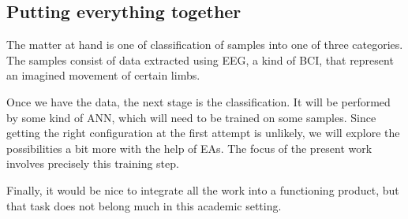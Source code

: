 	\subsection{Putting everything together}

		The matter at hand is one of classification of samples into one of three categories. The samples consist of data extracted using \acs{EEG}, a kind of \acs{BCI}, that represent an imagined movement of certain limbs.

		Once we have the data, the next stage is the classification. It will be performed by some kind of \acs{ANN}, which will need to be trained on some samples. Since getting the right configuration at the first attempt is unlikely, we will explore the possibilities a bit more with the help of \acs{EA}s. The focus of the present work involves precisely this training step.

		Finally, it would be nice to integrate all the work into a functioning product, but that task does not belong much in this academic setting.